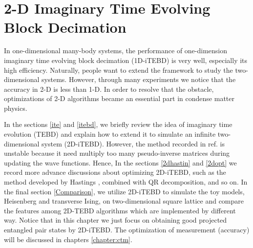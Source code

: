 \chapter{2-D Imaginary Time Evolving Block Decimation}
\label{chapter:2ditebd}

In one-dimensional many-body systems, the performance of one-dimension imaginary time evolving block decimation (1D-iTEBD) is very well, especially its high efficiency. Naturally, people want to extend the framework to study the two-dimensional systems. However, through many experiments we notice that the accuracy in 2-D is less than 1-D. In order to resolve that the obstacle, optimizations of 2-D algorithms became an essential part in condense matter physics. 

In the sections \ref{ite} and \ref{itebd}, we briefly review the idea of imaginary time evolution (TEBD) \cite{vidal_efficient_2003} \cite{vidal_efficient_2004} and explain how to extend it to simulate an infinite two-dimensional system (2D-iTEBD)\cite{li_efficient_2012}. However, the method recorded in ref.\cite{li_efficient_2012} is unstable because it need multiply too many pseudo-inverse matrices during updating the wave functions. Hence, In the sections \ref{2dhastin} and \ref{2dopt} we record more advance discussions about optimizing 2D-iTEBD, such as the method developed by Hastings \cite{}, combined with QR decomposition, and so on. In the final section \ref{Comparison}, we utilize 2D-iTEBD to simulate the toy models, Heisenberg and transverse Ising, on two-dimensional square lattice and compare the features among 2D-TEBD algorithms which are implemented by different way. Notice that in this chapter we just focus on obtaining good projected entangled pair states \cite{} by 2D-iTEBD. The optimization of measurement (accuracy) will be discussed in chapters \ref{chapter:ctm}.


